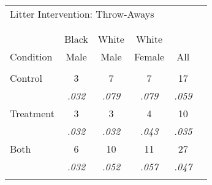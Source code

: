 \documentclass{standalone}
\begin{document}



\begin{tabular}{lccccc}
\multicolumn{5}{l}{Litter Intervention: Throw-Aways}\\[-1.0ex] 
\\[-1.8ex]\hline 
\hline \\[-1.8ex] 
          & Black  & White  & White  &    \\
Condition & Male   &   Male &  Female & All\\
\hline \\[-1.8ex] 
Control   & 3          &     7      &        7     &  17\\
          &\textit{.032}      &    \textit{.079}  &      \textit{.079}  & \textit{.059} \\
Treatment & 3          &     3      &        4     &  10 \\
          &\textit{.032}      &    \textit{.032}  &      \textit{.043}  &  \textit{.035} \\
Both      & 6          &    10      &        11    & 27 \\
          &\textit{.032}      &    \textit{.052}  &       \textit{.057} & \textit{.047}   \\
\hline \\[-1.8ex]
\end{tabular}
\end{document}
